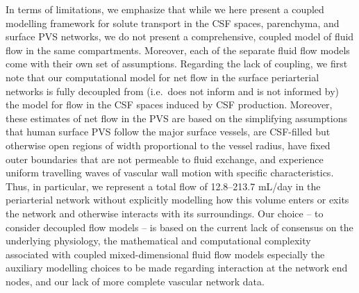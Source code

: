\documentclass[fleqn,10pt]{wlscirep}
\begin{document}
In terms of limitations, we emphasize that while we here present a
coupled modelling framework for solute transport in the CSF spaces,
parenchyma, and surface PVS networks, we do not present a
comprehensive, coupled model of fluid flow in the same
compartments. Moreover, each of the separate fluid flow models come
with their own set of assumptions. Regarding the lack of coupling, we
first note that our computational model for net flow in the surface
periarterial networks is fully decoupled from (i.e.~does not inform
and is not informed by) the model for flow in the CSF spaces induced
by CSF production. Moreover, these estimates of net flow in the PVS
are based on the simplifying assumptions that human surface PVS follow
the major surface vessels, are CSF-filled but otherwise open regions
of width proportional to the vessel radius, have fixed outer
boundaries that are not permeable to fluid exchange, and experience
uniform travelling waves of vascular wall motion with specific
characteristics. Thus, in particular, we represent a total flow of
12.8--213.7 mL/day in the periarterial network without explicitly
modelling how this volume enters or exits the network and otherwise
interacts with its surroundings. Our choice -- to consider decoupled
flow models -- is based on the current lack of consensus on the underlying physiology, the mathematical and computational complexity
associated with coupled mixed-dimensional fluid flow models especially
the auxiliary modelling choices to be made regarding interaction at
the network end nodes, and our lack of more complete vascular network
data.
\end{document}
